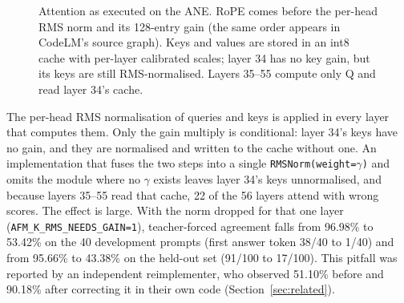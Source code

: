 \documentclass[11pt,reqno]{amsart}
\makeatletter
\newcommand{\code}[1]{\texttt{#1}}
\renewcommand\paragraph{\@startsection{paragraph}{4}\z@{.6\linespacing\@plus.2\linespacing}{-\fontdimen2\font}{\normalfont\bfseries}}
\theoremstyle{definition}
\makeatother
\begin{document}
\begin{figure}[!htbp]
\centering
{}
\caption{Attention as executed on the ANE. RoPE comes before the per-head RMS norm and its 128-entry gain (the same order appears in CodeLM's source graph). Keys and values are stored in an int8 cache with per-layer calibrated scales; layer 34 has no key gain, but its keys are still RMS-normalised. Layers 35--55 compute only Q and read layer 34's cache.}\label{fig:attn}
\end{figure}

\paragraph{The head norm is unconditional.} The per-head RMS normalisation of queries and keys is applied in every layer that computes them. Only the gain multiply is conditional: layer 34's keys have no gain, and they are normalised and written to the cache without one. An implementation that fuses the two steps into a single \code{RMSNorm(weight=}$\gamma$\code{)} and omits the module where no $\gamma$ exists leaves layer 34's keys unnormalised, and because layers 35--55 read that cache, 22 of the 56 layers attend with wrong scores. The effect is large. With the norm dropped for that one layer (\code{AFM\_K\_RMS\_NEEDS\_GAIN=1}), teacher-forced agreement falls from 96.98\% to 53.42\% on the 40 development prompts (first answer token 38/40 to 1/40) and from 95.66\% to 43.38\% on the held-out set (91/100 to 17/100). This pitfall was reported by an independent reimplementer, who observed 51.10\% before and 90.18\% after correcting it in their own code (Section~\ref{sec:related}).
\end{document}

